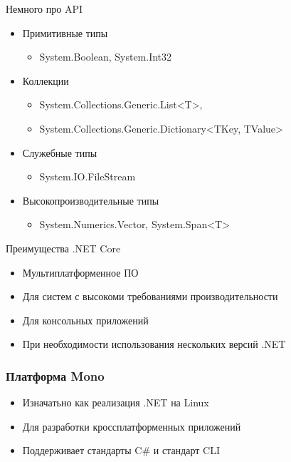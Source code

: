 \documentclass[14pt,pdf,hyperref={unicode}]{beamer}
\begin{document}
\begin{frame}{Немного про API}
\begin{itemize}
    \item Примитивные типы
    \begin{itemize}
        \item System.Boolean, System.Int32
    \end{itemize}
    \item Коллекции
    \begin{itemize}
        \item System.Collections.Generic.List<T>, 
        \item System.Collections.Generic.Dictionary<TKey, TValue>
    \end{itemize}
    \item Служебные типы
    \begin{itemize}
        \item System.IO.FileStream
    \end{itemize}
    \item Высокопроизводительные типы
    \begin{itemize}
        \item System.Numerics.Vector, System.Span<T>
    \end{itemize}
\end{itemize}
\end{frame}

\begin{frame}{Преимущества .NET Core}
\begin{itemize}
    \item Мультиплатформенное ПО
    \item Для систем с высокоми требованиями производительности
    \item Для консольных приложений 
    \item При необходимости использования нескольких версий .NET
\end{itemize}
    
\end{frame}

\begin{frame}
\frametitle{Платформа Mono}
\begin{itemize}
    \item Изначатьно как реализация .NET на Linux
    \item Для разработки кроссплатформенных приложений
    \item Поддерживает стандарты C\# и стандарт CLI
\end{itemize}
\end{frame}
\end{document}
